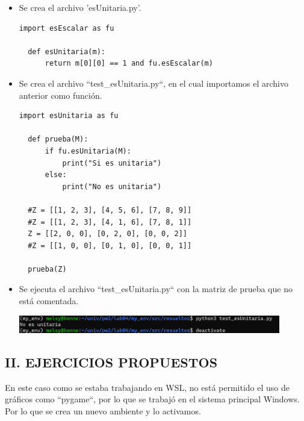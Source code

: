\documentclass{article}
\begin{document}
  \begin{itemize}
  
  \item Se crea el archivo 'esUnitaria.py'.

  \begin{lstlisting}[style=python]
  import esEscalar as fu

  def esUnitaria(m):
      return m[0][0] == 1 and fu.esEscalar(m)
  \end{lstlisting}

    
  \item Se crea el archivo ``test\_esUnitaria.py``, en el cual importamos el archivo anterior como función.
    
  \begin{lstlisting}[style=python]
  import esUnitaria as fu

  def prueba(M):
      if fu.esUnitaria(M):
          print("Si es unitaria")
      else:
          print("No es unitaria")

  #Z = [[1, 2, 3], [4, 5, 6], [7, 8, 9]]
  #Z = [[1, 2, 3], [4, 1, 6], [7, 8, 1]]
  Z = [[2, 0, 0], [0, 2, 0], [0, 0, 2]]
  #Z = [[1, 0, 0], [0, 1, 0], [0, 0, 1]]

  prueba(Z)
  \end{lstlisting}

  \item Se ejecuta el archivo ``test\_esUnitaria.py`` con la matriz de prueba que no está comentada.

  \begin{minipage}{\linewidth}
    \centering
    \includegraphics[width=0.9\textwidth]{imagenes/r_unitaria.png}
  \end{minipage}

  \end{itemize}

\pagebreak

\subsection*{II. EJERCICIOS PROPUESTOS}

  \vspace{\baselineskip}

  En este caso como se estaba trabajando en WSL, no está permitido el uso de gráficos como ``pygame``, por lo que se trabajó en el sistema principal Windows. Por lo que se crea un nuevo ambiente y lo activamos.
  
\end{document}
